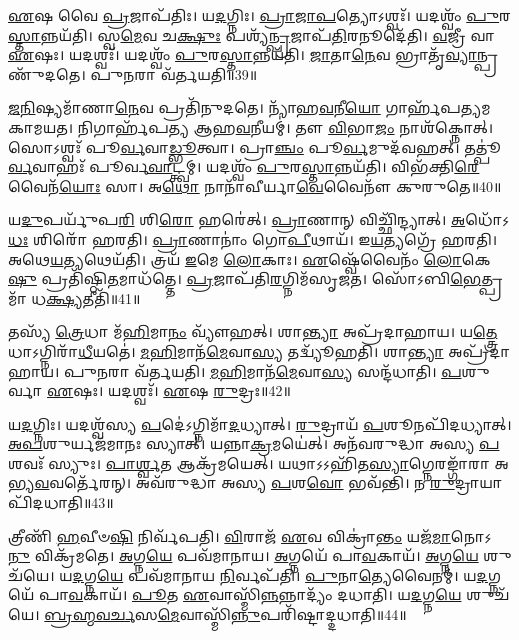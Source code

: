 \-\ul{𑌏}\-𑌷 𑌵𑍈 \ul{𑌪𑍍𑌰}\-𑌜𑌾\-𑌪᳴𑌤𑌿𑌃।
𑌯\-\ul{𑌦}\-𑌗𑍍𑌨𑌿𑌃।
\-\ul{𑌪𑍍𑌰𑌾}\-\-\ul{𑌜𑌾}\-\-\ul{𑌪}\-𑌤𑍍𑌯𑍋\-𑌽𑌶𑍍𑌵𑌃᳴।
𑌯𑌦𑌶𑍍𑌵𑌂᳴ \ul{𑌪𑍁}\-𑌰\-\ul{𑌸𑍍𑌤𑌾}\-𑌨𑍍𑌨𑌯᳴𑌤𑌿।
𑌸𑍍𑌵\-\ul{𑌮𑍇}\-𑌵 𑌚\-\ul{𑌕𑍍𑌷𑍁𑌃} 𑌪𑌶𑍍𑌯᳴\-\ul{𑌨𑍍𑌪𑍍𑌰}\-𑌜𑌾𑌪᳴\-\ul{𑌤𑌿}\-𑌰𑌨𑍂𑌦𑍇᳴𑌤𑌿।
\-\ul{𑌵}\-𑌜𑍍𑌰𑍀 𑌵𑌾 \ul{𑌏}\-𑌷𑌃।
𑌯𑌦𑌶𑍍𑌵𑌃᳴।
𑌯𑌦𑌶𑍍𑌵𑌂᳴ \ul{𑌪𑍁}\-𑌰\-\ul{𑌸𑍍𑌤𑌾}\-𑌨𑍍𑌨𑌯᳴𑌤𑌿।
\-\ul{𑌜𑌾}\-𑌤𑌾\-\ul{𑌨𑍇}\-𑌵 𑌭𑍍𑌰𑌾𑌤𑍃᳴\-\ul{𑌵𑍍𑌯𑌾}\-𑌨𑍍𑌪𑍍𑌰𑌣𑍁᳴𑌦𑌤𑍇।
𑌪𑍁\-\ul{𑌨}\-𑌰𑌾 𑌵᳴𑌰𑍍𑌤𑌯𑌤𑌿॥39॥

\-\ul{𑌜}\-\-\ul{𑌨𑌿}\-𑌷𑍍𑌯𑌮𑌾᳴𑌣𑌾\-\ul{𑌨𑍇}\-𑌵 𑌪𑍍𑌰𑌤𑌿᳴\-𑌨𑍁𑌦𑌤𑍇।
𑌨𑍍𑌯𑌾᳴𑌹\-\ul{𑌵}\-𑌨𑍀\-\ul{𑌯𑍋} 𑌗𑌾𑌰𑍍\mbox{}𑌹᳴𑌪𑌤𑍍𑌯\-𑌮𑌕𑌾𑌮𑌯𑌤।
𑌨𑌿𑌗𑌾𑌰𑍍\mbox{}𑌹᳴𑌪𑌤𑍍𑌯 𑌆𑌹\-\ul{𑌵}\-𑌨𑍀𑌯𑌮𑍍॑।
𑌤𑍗 \ul{𑌵𑌿}\-𑌭𑌾\-\ul{𑌜𑌂} 𑌨𑌾𑌶᳴𑌕𑍍𑌨𑍋𑌤𑍍।
𑌸𑍋𑌽𑌶𑍍𑌵𑌃᳴ 𑌪𑍂\-\ul{𑌰𑍍𑌵}\-𑌵𑌾\-\ul{𑌡𑍍𑌭𑍂}\-𑌤𑍍𑌵𑌾।
𑌪𑍍𑌰𑌾\-\ul{𑌞𑍍𑌚𑌂} 𑌪𑍂\-\ul{𑌰𑍍𑌵}\-𑌮𑍁𑌦᳴𑌵𑌹𑌤𑍍।
𑌤𑌤𑍍𑌪𑍂॑\-\ul{𑌰𑍍𑌵}\-𑌵𑌾𑌹𑌃᳴ 𑌪𑍂𑌰𑍍𑌵\-\ul{𑌵𑌾}\-𑌟𑍍𑌤𑍍𑌵𑌮𑍍।
𑌯𑌦𑌶𑍍𑌵𑌂᳴ \ul{𑌪𑍁}\-𑌰\-\ul{𑌸𑍍𑌤𑌾}\-𑌨𑍍𑌨𑌯᳴𑌤𑌿।
𑌵𑌿𑌭᳴𑌕𑍍𑌤𑌿\-\-\ul{𑌰𑍇}\-𑌵𑍈𑌨᳴\-\ul{𑌯𑍋𑌃} 𑌸𑌾।
𑌅\-\ul{𑌥𑍋} 𑌨𑌾𑌨𑌾᳴𑌵𑍀𑌰𑍍𑌯𑌾\-\ul{𑌵𑍇}\-𑌵𑍈𑌨𑍗᳴ 𑌕𑍁𑌰𑍁𑌤𑍇॥40॥

𑌯\-\ul{𑌦𑍁}\-𑌪𑌰𑍍𑌯𑍁᳴𑌪\-\ul{𑌰𑌿} 𑌶𑌿\-\ul{𑌰𑍋} 𑌹𑌰𑍇॑𑌤𑍍।
\-\ul{𑌪𑍍𑌰𑌾}\-𑌣𑌾𑌨𑍍‌ 𑌵𑌿𑌚𑍍𑌛𑌿᳴𑌨𑍍𑌦𑍍𑌯𑌾𑌤𑍍।
\-\ul{𑌅}\-𑌧𑍋᳴𑌽\-\ul{𑌧𑌃} 𑌶𑌿𑌰𑍋᳴ 𑌹𑌰𑌤𑌿।
\-\ul{𑌪𑍍𑌰𑌾}\-𑌣𑌾𑌨𑌾𑌂॑ 𑌗𑍋\-\ul{𑌪𑍀}\-𑌥𑌾𑌯᳴।
𑌇\-\ul{𑌯}\-𑌤𑍍𑌯𑌗𑍍𑌰𑍇᳴ 𑌹𑌰𑌤𑌿।
𑌅𑌥𑍇\-\ul{𑌯}\-𑌤𑍍𑌯𑌥𑍇𑌯᳴𑌤𑌿।
𑌤𑍍𑌰𑌯᳴ \ul{𑌇}\-𑌮𑍇 \ul{𑌲𑍋}\-𑌕𑌾𑌃।
\-\ul{𑌏}\-𑌷𑍍𑌵𑍇᳴𑌵𑍈𑌨𑌂᳴ \ul{𑌲𑍋}\-𑌕𑍇\-\ul{𑌷𑍁} 𑌪𑍍𑌰𑌤𑌿᳴\-𑌷𑍍𑌠𑌿\-\ul{𑌤}\-𑌮𑌾𑌧᳴𑌤𑍍𑌤𑍇।
\-\ul{𑌪𑍍𑌰}\-𑌜𑌾𑌪᳴𑌤𑌿\-\ul{𑌰}\-𑌗𑍍𑌨𑌿𑌮᳴\-𑌸𑍃𑌜𑌤।
𑌸𑍋᳴𑌽𑌬𑌿\-\ul{𑌭𑍇}\-𑌤𑍍𑌪𑍍𑌰 𑌮𑌾᳴ 𑌧\-\ul{𑌕𑍍𑌷𑍍𑌯}\-𑌤𑍀𑌤𑌿᳴॥41॥

𑌤𑌸𑍍𑌯᳴ \ul{𑌤𑍍𑌰𑍇}\-𑌧𑌾 𑌮᳴\-\ul{𑌹𑌿}\-𑌮𑌾\-\ul{𑌨𑌂} 𑌵𑍍𑌯𑍗᳴𑌹𑌤𑍍।
𑌶𑌾\-\ul{𑌨𑍍𑌤𑍍𑌯𑌾} 𑌅𑌪𑍍𑌰᳴𑌦𑌾𑌹𑌾𑌯।
𑌯\-\ul{𑌤𑍍𑌤𑍍𑌰𑍇}\-𑌧𑌾\-𑌽𑌗𑍍𑌨𑌿𑌰𑌾᳴\-\ul{𑌧𑍀}\-𑌯𑌤𑍇॑।
\-\ul{𑌮}\-\-\ul{𑌹𑌿}\-𑌮𑌾𑌨᳴\-\ul{𑌮𑍇}\-𑌵𑌾\-\ul{𑌸𑍍𑌯} 𑌤𑌦𑍍𑌵𑍍𑌯𑍂᳴𑌹𑌤𑌿।
𑌶𑌾\-\ul{𑌨𑍍𑌤𑍍𑌯𑌾} 𑌅𑌪𑍍𑌰᳴𑌦𑌾𑌹𑌾𑌯।
𑌪𑍁\-\ul{𑌨}\-𑌰𑌾 𑌵᳴𑌰𑍍𑌤𑌯𑌤𑌿।
\-\ul{𑌮}\-\-\ul{𑌹𑌿}\-𑌮𑌾𑌨᳴\-\ul{𑌮𑍇}\-𑌵𑌾\-\ul{𑌸𑍍𑌯} 𑌸𑌨𑍍𑌦᳴𑌧𑌾𑌤𑌿।
\-\ul{𑌪}\-𑌶𑍁𑌰𑍍𑌵𑌾 \ul{𑌏}\-𑌷𑌃।
𑌯𑌦𑌶𑍍𑌵𑌃᳴।
\-\ul{𑌏}\-𑌷 \ul{𑌰𑍁}\-𑌦𑍍𑌰𑌃॥42॥

𑌯\-\ul{𑌦}\-𑌗𑍍𑌨𑌿𑌃।
𑌯𑌦𑌶𑍍𑌵᳴𑌸𑍍𑌯 \ul{𑌪}\-𑌦𑍇॑\-𑌽𑌗𑍍𑌨𑌿𑌮𑌾᳴\-\ul{𑌦}\-𑌧𑍍𑌯𑌾𑌤𑍍।
\-\ul{𑌰𑍁}\-𑌦𑍍𑌰𑌾𑌯᳴ \ul{𑌪}\-𑌶𑍂𑌨𑌪𑌿᳴\-𑌦𑌧𑍍𑌯𑌾𑌤𑍍।
\-\ul{𑌅}\-\-\ul{𑌪}\-𑌶𑍁𑌰𑍍𑌯𑌜᳴𑌮𑌾𑌨𑌃 𑌸𑍍𑌯𑌾𑌤𑍍।
𑌯𑌨𑍍𑌨𑌾\-\ul{𑌕𑍍𑌰}\-𑌮𑌯𑍇॑𑌤𑍍।
𑌅𑌨᳴𑌵𑌰𑍁𑌦𑍍𑌧𑌾 𑌅𑌸𑍍𑌯 \ul{𑌪}\-𑌶𑌵𑌃᳴ 𑌸𑍍𑌯𑍁𑌃।
\-\ul{𑌪𑌾}\-\-\ul{𑌰𑍍𑌶𑍍𑌵}\-𑌤 𑌆𑌕𑍍𑌰᳴𑌮𑌯𑍇𑌤𑍍।
𑌯𑌥𑌾𑌽𑌽𑌹𑌿᳴𑌤\-\ul{𑌸𑍍𑌯𑌾}\-𑌗𑍍𑌨𑍇𑌰𑌙𑍍𑌗𑌾᳴𑌰𑌾 𑌅𑌭𑍍𑌯\-\ul{𑌵}\-𑌵𑌰𑍍𑌤𑍇᳴𑌰𑌨𑍍।
𑌅𑌵᳴𑌰𑍁𑌦𑍍𑌧𑌾 𑌅𑌸𑍍𑌯 \ul{𑌪}\-𑌶\-\ul{𑌵𑍋} 𑌭𑌵᳴𑌨𑍍𑌤𑌿।
𑌨 \ul{𑌰𑍁}\-𑌦𑍍𑌰𑌾𑌯𑌾𑌪𑌿᳴𑌦𑌧𑌾𑌤𑌿॥43॥

𑌤𑍍𑌰𑍀𑌣𑌿᳴ \ul{𑌹}\-𑌵𑍀𑍞\-\ul{𑌷𑌿} 𑌨𑌿𑌰𑍍𑌵᳴𑌪𑌤𑌿।
\-\ul{𑌵𑌿}\-𑌰𑌾𑌜᳴ \ul{𑌏}\-𑌵 𑌵𑌿𑌕𑍍𑌰𑌾॑\-\ul{𑌨𑍍𑌤𑌂} 𑌯𑌜᳴\-\ul{𑌮𑌾}\-𑌨𑍋𑌽\-\ul{𑌨𑍁} 𑌵𑌿𑌕𑍍𑌰᳴𑌮𑌤𑍇।
\-\ul{𑌅}\-𑌗𑍍𑌨\-\ul{𑌯𑍇} 𑌪𑌵᳴𑌮𑌾𑌨𑌾𑌯।
\-\ul{𑌅}\-𑌗𑍍𑌨𑌯𑍇᳴ 𑌪𑌾\-\ul{𑌵}\-𑌕𑌾𑌯᳴।
\-\ul{𑌅}\-𑌗𑍍𑌨\-\ul{𑌯𑍇} 𑌶𑍁𑌚᳴𑌯𑍇।
𑌯\-\ul{𑌦}\-𑌗𑍍𑌨\-\ul{𑌯𑍇} 𑌪𑌵᳴𑌮𑌾𑌨𑌾𑌯 \ul{𑌨𑌿}\-𑌰𑍍𑌵𑌪᳴𑌤𑌿।
\-\ul{𑌪𑍁}\-𑌨𑌾\-\ul{𑌤𑍍𑌯𑍇}\-𑌵𑍈𑌨𑌮𑍍॑।
𑌯\-\ul{𑌦}\-𑌗𑍍𑌨𑌯𑍇᳴ 𑌪𑌾\-\ul{𑌵}\-𑌕𑌾𑌯᳴।
\-\ul{𑌪𑍂}\-𑌤 \ul{𑌏}\-𑌵𑌾𑌸𑍍𑌮𑌿᳴\-\ul{𑌨𑍍𑌨}\-𑌨𑍍𑌨𑌾𑌦𑍍𑌯𑌂᳴ 𑌦𑌧𑌾𑌤𑌿।
𑌯\-\ul{𑌦}\-𑌗𑍍𑌨\-\ul{𑌯𑍇} 𑌶𑍁𑌚᳴𑌯𑍇।
\-\ul{𑌬𑍍𑌰}\-\-\ul{𑌹𑍍𑌮}\-\-\ul{𑌵}\-\-\ul{𑌰𑍍𑌚}\-𑌸\-\ul{𑌮𑍇}\-𑌵𑌾𑌸𑍍𑌮𑌿᳴\-\ul{𑌨𑍍𑌨𑍁}\-𑌪𑌰𑌿᳴𑌷𑍍𑌟𑌾𑌦𑍍𑌦𑌧𑌾𑌤𑌿॥44॥\anuvakamend[\-\ul{𑌏}\-\-\ul{𑌨}\-\-\ul{𑌮𑌾}\-\-\ul{𑌹}\-\-\ul{𑌵}\-𑌨𑍀𑌯𑌂᳴ 𑌧𑌤𑍍𑌤𑍇\-𑌽\-\ul{𑌶𑍍𑌵}\-𑌤𑍍𑌵𑌂 𑌵᳴𑌰𑍍𑌤𑌯𑌤𑌿 𑌕𑍁𑌰𑍁\-\ul{𑌤} 𑌇𑌤𑌿᳴ \ul{𑌰𑍁}\-𑌦𑍍𑌰𑍋 𑌦᳴𑌧𑌾\-\ul{𑌤𑌿} 𑌯\-\ul{𑌦}\-𑌗𑍍𑌨\-\ul{𑌯𑍇} 𑌶𑍁𑌚᳴\-\ul{𑌯} 𑌏𑌕𑌂᳴ 𑌚]

